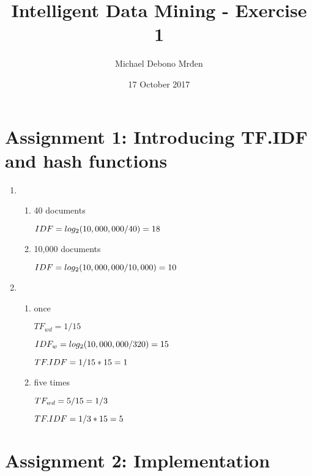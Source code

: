 \documentclass{article}
\title{Intelligent Data Mining - Exercise 1}
\author{Michael Debono Mrđen}
\date{17 October 2017}
\begin{document}
\maketitle

\section{Assignment 1: Introducing TF.IDF and hash functions}
\renewcommand{\labelenumi}{\alph{enumi}.}
\renewcommand{\labelenumii}{(\alph{enumii})}
\begin{enumerate}
\item
\begin{enumerate}
\item{40 documents

$IDF \\ = log_2(10,000,000/40) \\ = 18$}

\item{10,000 documents

$IDF \\ = log_2(10,000,000/10,000) \\ = 10$}
\end{enumerate}
\item
\begin{enumerate}
\item{once

$TF_{wd} = 1/15$

$IDF_w = log_2(10,000,000/320) \\ = 15$

$TF.IDF = 1/15 * 15 \\ = 1$}

\item{five times

$TF_{wd} = 5/15 \\ = 1/3$

$TF.IDF = 1/3 * 15 \\ = 5$}
\end{enumerate}
\end{enumerate}
\section{Assignment 2: Implementation}
\end{document}
